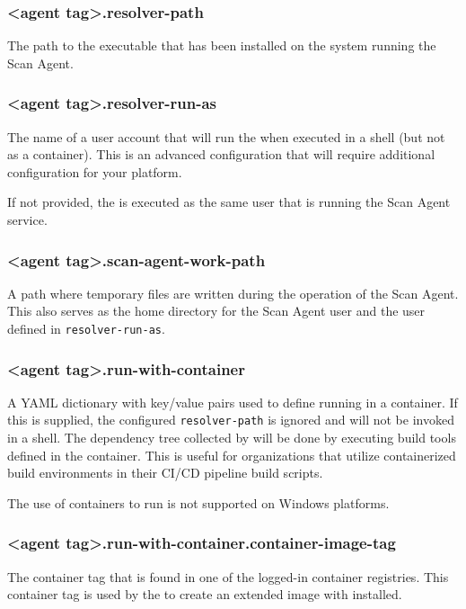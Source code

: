 \subsubsection{<agent tag>.resolver-path}\label{sec:agent-resolver-path}
The path to the \scaresolver executable that has been installed on the system running the Scan Agent.


\subsubsection{<agent tag>.resolver-run-as}\label{sec:agent-resolver-run-as}
The name of a user account that will run the \scaresolver when executed in a shell (but not as a container).  This
is an advanced configuration that will require additional configuration for your platform.  

If not provided, the \scaresolver is executed as the same user that is running the Scan Agent service.

\subsubsection{<agent tag>.scan-agent-work-path}\label{sec:scan-agent-work-path}
A path where temporary files are written during the operation of the Scan Agent.  This also serves as the home
directory for the Scan Agent user and the user defined in \texttt{resolver-run-as}.

\subsubsection{<agent tag>.run-with-container}\label{sec:agent-run-with-container}
A YAML dictionary with key/value pairs used to define running \scaresolver in a container.  If this is supplied,
the configured \texttt{resolver-path} is ignored and \scaresolver will not be invoked in a shell.  The dependency
tree collected by \scaresolver will be done by executing build tools defined in the container.  This is useful for
organizations that utilize containerized build environments in their CI/CD pipeline build scripts.

The use of containers to run \scaresolver is not supported on Windows platforms.

\subsubsection{<agent tag>.run-with-container.container-image-tag}\label{sec:agent-container-image-tag}
The container tag that is found in one of the logged-in container registries.  This container tag is used by the \toolkit
to create an extended image with \scaresolver installed.

